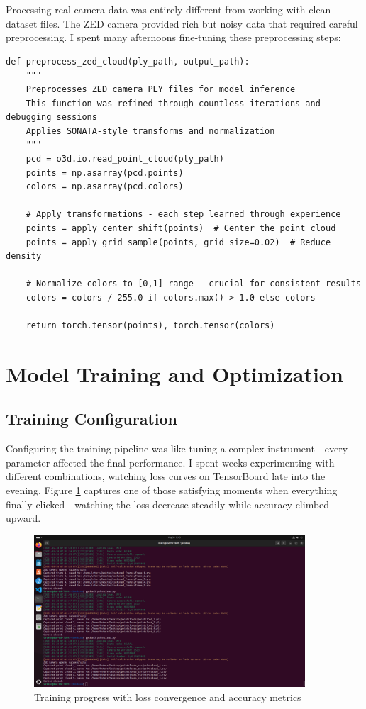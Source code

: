 \documentclass[12pt,a4paper]{report}
\begin{document}
Processing real camera data was entirely different from working with clean dataset files. The ZED camera provided rich but noisy data that required careful preprocessing. I spent many afternoons fine-tuning these preprocessing steps:

\begin{lstlisting}[caption=ZED Data Preprocessing - Refined Through Trial and Error, label=lst:zed_preprocess]
def preprocess_zed_cloud(ply_path, output_path):
    """
    Preprocesses ZED camera PLY files for model inference
    This function was refined through countless iterations and debugging sessions
    Applies SONATA-style transforms and normalization
    """
    pcd = o3d.io.read_point_cloud(ply_path)
    points = np.asarray(pcd.points)
    colors = np.asarray(pcd.colors)
    
    # Apply transformations - each step learned through experience
    points = apply_center_shift(points)  # Center the point cloud
    points = apply_grid_sample(points, grid_size=0.02)  # Reduce density
    
    # Normalize colors to [0,1] range - crucial for consistent results
    colors = colors / 255.0 if colors.max() > 1.0 else colors

    return torch.tensor(points), torch.tensor(colors)
\end{lstlisting}

\section{Model Training and Optimization}

\subsection{Training Configuration}

Configuring the training pipeline was like tuning a complex instrument - every parameter affected the final performance. I spent weeks experimenting with different combinations, watching loss curves on TensorBoard late into the evening. Figure \ref{fig:training_progress} captures one of those satisfying moments when everything finally clicked - watching the loss decrease steadily while accuracy climbed upward.

\begin{figure}[htbp]
    \centering
    \includegraphics[width=0.9\textwidth]{figures/early_experiments.png}
    \caption{Training progress with loss convergence and accuracy metrics}
    \label{fig:training_progress}
\end{figure}
\end{document}
